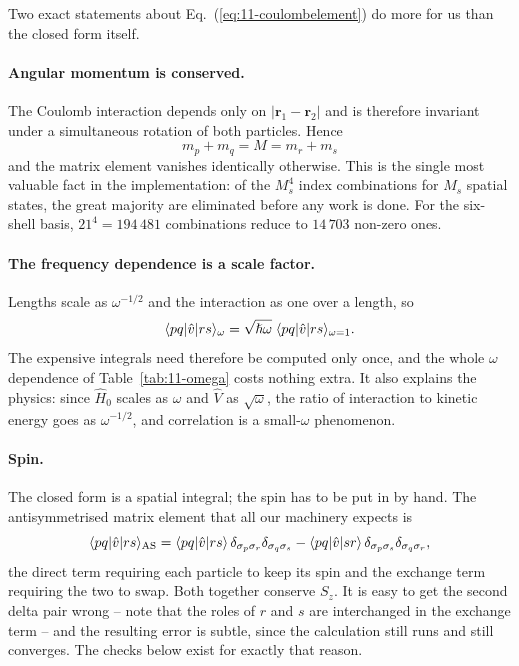 Two exact statements about Eq.~(\ref{eq:11-coulombelement}) do more for us
than the closed form itself.

\paragraph{Angular momentum is conserved.}
The Coulomb interaction depends only on $|\bm{r}_1-\bm{r}_2|$ and is therefore
invariant under a simultaneous rotation of both particles.  Hence
\begin{equation}
  \boxed{\;m_p+m_q = M = m_r+m_s\;}
  \label{eq:11-mconservation}
\end{equation}
and the matrix element vanishes identically otherwise.  This is the
single most valuable fact in the implementation: of the $M_s^4$ index
combinations for $M_s$ spatial states, the great majority are eliminated
before any work is done.  For the six-shell basis, $21^4=194\,481$
combinations reduce to $14\,703$ non-zero ones.

\paragraph{The frequency dependence is a scale factor.}
Lengths scale as $\omega^{-1/2}$ and the interaction as one over a length, so
\begin{equation}
  \langle pq | \hat{v} | rs \rangle_{\omega}
   = \sqrt{\hslash\omega}\;\langle pq | \hat{v} | rs \rangle_{\omega=1}.
  \label{eq:11-omegascaling}
\end{equation}
The expensive integrals need therefore be computed only once, and the whole
$\omega$ dependence of Table~\ref{tab:11-omega} costs nothing extra.  It also
explains the physics: since $\hat{H}_0$ scales as $\omega$ and $\hat{V}$ as
$\sqrt{\omega}$, the ratio of interaction to kinetic energy goes as
$\omega^{-1/2}$, and correlation is a small-$\omega$ phenomenon.

\paragraph{Spin.}
The closed form is a spatial integral; the spin has to be put in by hand.  The
antisymmetrised matrix element that all our machinery expects is
\begin{equation}
  \langle pq | \hat{v} | rs \rangle_{\mathrm{AS}}
   = \langle pq | \hat{v} | rs \rangle\,
     \delta_{\sigma_p\sigma_r}\delta_{\sigma_q\sigma_s}
   - \langle pq | \hat{v} | sr \rangle\,
     \delta_{\sigma_p\sigma_s}\delta_{\sigma_q\sigma_r},
  \label{eq:11-antisym}
\end{equation}
the direct term requiring each particle to keep its spin and the exchange term
requiring the two to swap.  Both together conserve $S_z$.  It is easy to get
the second delta pair wrong -- note that the roles of $r$ and $s$ are
interchanged in the exchange term -- and the resulting error is subtle, since
the calculation still runs and still converges.  The checks below exist for
exactly that reason.

